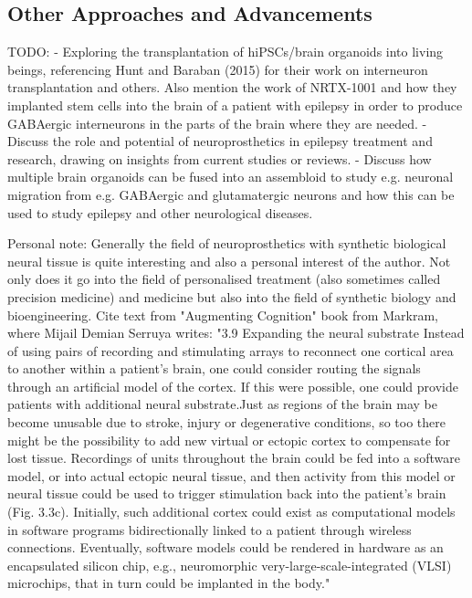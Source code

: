 \documentclass[10pt]{article}
\begin{document}
\begin{sloppypar}
  \subsection{Other Approaches and Advancements}
  \label{sec:other-approaches-and-advancements}

  TODO:
  - Exploring the transplantation of hiPSCs/brain organoids into living beings, referencing Hunt and Baraban (2015) for their work on interneuron transplantation and others. Also mention the work of NRTX-1001 and how they implanted stem cells into the brain of a patient with epilepsy in order to produce GABAergic interneurons in the parts of the brain where they are needed.
  - Discuss the role and potential of neuroprosthetics in epilepsy treatment and research, drawing on insights from current studies or reviews.
  - Discuss how multiple brain organoids can be fused into an assembloid to study e.g. neuronal migration from e.g. GABAergic and glutamatergic neurons and how this can be used to study epilepsy and other neurological diseases.

  Personal note: Generally the field of neuroprosthetics with synthetic biological neural tissue is quite interesting and also a personal interest of the author. Not only does it go into the field of personalised treatment (also sometimes called precision medicine) and medicine but also into the field of synthetic biology and bioengineering. Cite text from "Augmenting Cognition" book from Markram, where Mijail Demian Serruya writes: "3.9 Expanding the neural substrate  Instead of using pairs of recording and stimulating arrays to reconnect one cortical area to another within a patient’s brain, one could  consider routing the signals through an artificial model of the cortex.  If this were possible, one could provide patients with additional neural substrate.Just as regions of the brain may be become unusable due  to stroke, injury or degenerative conditions, so too there might be the  possibility to add new virtual or ectopic cortex to compensate for lost  tissue. Recordings of units throughout the brain could be fed into a  software model, or into actual ectopic neural tissue, and then activity from this model or neural tissue could be used to trigger stimulation back into the patient’s brain (Fig. 3.3c). Initially, such additional cortex could exist as computational models in software programs  bidirectionally linked to a patient through wireless connections. Eventually, software models could be rendered in hardware as an encapsulated silicon chip, e.g., neuromorphic very-large-scale-integrated  (VLSI) microchips, that in turn could be implanted in the body."


\end{sloppypar}
\end{document}
